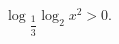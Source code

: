 \begin{ex}[type=inequality]
	\begin{condition}
		$ \log$\tiny$_{\dfrac{1}{3}}$\normalsize$\log_2 x^2 > 0 .$
	\end{condition}
\end{ex}